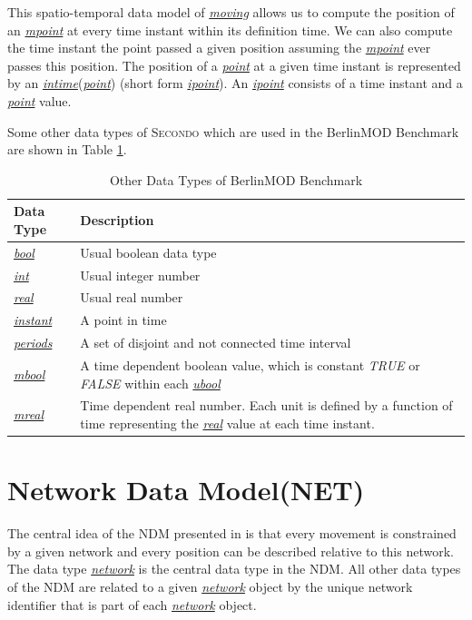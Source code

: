 \documentclass[a4paper]{article}
\newcommand{\secondo}{\textsc{Secondo}}
\newcommand{\bmodb} {BerlinMOD Benchmark}
\newcommand{\dt}[1]{\textsl{\underline{#1}}}
\newcommand{\true}{\textsl{TRUE}}
\newcommand{\false}{\textsl{FALSE}}
\begin{document}
This spatio-temporal data model of \dt{moving} allows us to compute the position
of an \dt{mpoint} at every time instant within its definition time.
We can also compute the time instant the point passed a
given position assuming the \dt{mpoint} ever passes this position. The position of a
\dt{point} at a given time instant is represented by an \dt{intime}(\dt{point})
(short form \dt{ipoint}). An \dt{ipoint} consists of a time instant and a \dt{point} value.

Some other data types of \secondo{} which are used in the \bmodb{} are shown in
Table \ref{tab:bmodbdatatypes}.
\begin{table}[H]
\begin{center}
\begin{scriptsize}
\begin{tabularx}{1.0\textwidth}{|l|X|}
\hline
\textbf{Data Type} & \textbf{Description} \\
\hline
\dt{bool} & Usual boolean data type\\
\hline
\dt{int} & Usual integer number\\
\hline
\dt{real} & Usual real number\\
\hline
\dt{instant} & A point in time\\
\hline
\dt{periods} & A set of disjoint and not connected time interval\\
\hline
\dt{mbool} & A time dependent boolean value, which is constant \true{} or \false{}
within each \dt{ubool} \\
\hline
\dt{mreal} & Time dependent real number. Each unit is defined by a function
of time representing the \dt{real} value at each time instant.\\
\hline
\end{tabularx}
\end{scriptsize}
\caption{Other Data Types of \bmodb{}}
\label{tab:bmodbdatatypes}
\end{center}
\end{table}
\section{Network Data Model(NET)}
\label{sec:netdatamod}
The central idea of the NDM presented in \cite{NetworkGueting} is that
every movement is constrained by a given network and every position can be described
relative to this network. The data type \dt{network} is the central
data type in the NDM. All other data types of the NDM
are related to a given \dt{network} object by the unique network identifier that
is part of each \dt{network} object.
\end{document}
